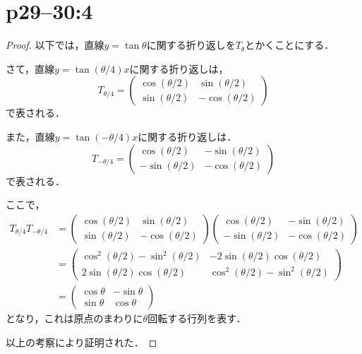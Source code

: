 \documentclass[a4paper,10pt,fleqn]{ltjsarticle}
\begin{document}
\section*{p29--30:4}

\begin{tleftbar}
  \begin{proof}
    以下では，直線$y= \tan \theta$に関する折り返しを$T_{\theta}$とかくことにする．

    さて，直線$ y = \tan (\theta /4) x$に関する折り返しは，
    \[
      T_{\theta/4} = \begin{pmatrix} \cos (\theta /2) & \sin (\theta /2) \\  \sin (\theta /2) & -\cos (\theta /2) \end{pmatrix}
    \]
    で表される．

    また，直線$y = \tan (-\theta /4)x$に関する折り返しは．
    \[
      T_{-\theta/4} = \begin{pmatrix} \cos (\theta /2) & -\sin (\theta/2) \\ -\sin (\theta/2) & -\cos (\theta /2) \end{pmatrix}
    \]
    で表される．

    ここで，
    \begin{align*}
      T_{\theta/4} T_{-\theta/4} & = \begin{pmatrix} \cos (\theta /2) & \sin (\theta /2) \\  \sin (\theta /2) & -\cos (\theta /2) \end{pmatrix} \begin{pmatrix} \cos (\theta /2) & -\sin (\theta/2) \\ -\sin (\theta/2) & -\cos (\theta /2) \end{pmatrix} \\
                                 & =\begin{pmatrix} \cos ^2 (\theta /2)-\sin ^2 (\theta/2) & -2\sin (\theta/2) \cos (\theta/2) \\ 2\sin (\theta/2) \cos (\theta/2) & \cos ^2 (\theta/2)-\sin ^2 (\theta/2) \end{pmatrix}                                  \\
                                 & = \begin{pmatrix} \cos \theta & -\sin \theta \\ \sin \theta & \cos \theta \end{pmatrix}
    \end{align*}
    となり，これは原点のまわりに$\theta$回転する行列を表す．

    以上の考察により証明された．
  \end{proof}
\end{tleftbar}
\end{document}

